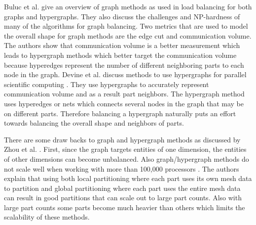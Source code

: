 \documentclass{thesis}
\begin{document}
Buluc et al. \cite{surveygraph} give an overview of graph methods as used in 
load balancing 
for both graphs and hypergraphs. They also discuss the challenges and 
NP-hardness of many of the algorithms for graph balancing. Two metrics that 
are used to model the overall shape for graph methods are the edge cut and 
communication volume. The authors show that communication volume is a better 
measurement which leads to hypergraph methods which better target the 
communication volume because hyperedges represent the number of different 
neighboring parts to each node in the graph. Devine et al. discuss methods 
to use hypergraphs for parallel scientific computing \cite{hypergraph}. They
use hypergraphs to accurately represent communication volume and as a result
part neighbors. The hypergraph method uses hyperedges or nets which connects 
several nodes in the graph that may be on different parts. Therefore 
balancing a hypergraph naturally puts an effort towards balancing the overall
shape and neighbors of parts. 

There are some draw backs to graph and hypergraph methods as discussed 
by Zhou et al. \cite{zhougraph}. First, since the graph targets 
entities of one dimension, the entities of other dimensions can become 
unbalanced. Also graph/hypergraph methods do not scale well when working with 
more than 
100,000 processors \cite{zhougraph}. The authors explain that using both 
local partitioning where each part uses its own mesh data to partition  
and global partitioning where each part uses the entire mesh data can result 
in good partitions that can scale out to
large part counts. Also with large part counts some parts become much 
heavier than others which limits the scalability of these methods.
\end{document}
